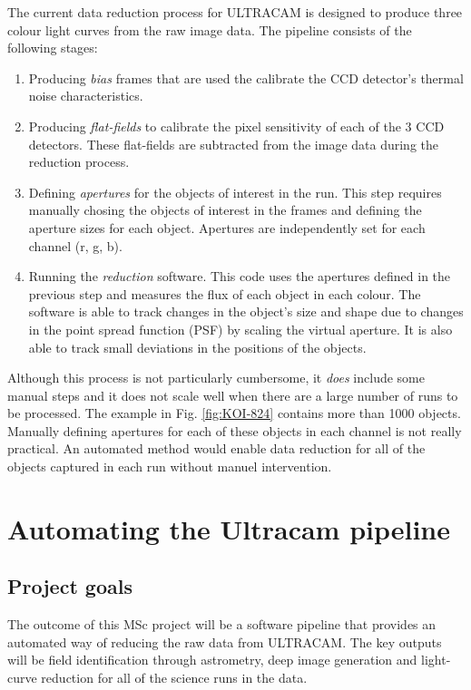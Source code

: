 \documentclass[a4paper,10pt]{article}
\begin{document}
The current data reduction process for ULTRACAM is designed to produce three colour light curves from the raw image data. The pipeline consists of the following stages:
\begin{enumerate}
	\item Producing \emph{bias} frames that are used the calibrate the CCD detector's thermal noise characteristics. 
	\item Producing \emph{flat-fields} to calibrate the pixel sensitivity of each of the 3 CCD detectors. These flat-fields are subtracted from the image data during the reduction process.
	\item Defining \emph{apertures} for the objects of interest in the run. This step requires manually chosing the objects of interest in the frames and defining the aperture sizes for each object. Apertures are independently set for each channel (r, g, b). 
	\item Running the \emph{reduction} software. This code uses the apertures defined in the previous step and measures the flux of each object in each colour. The software is able to track changes in the object's size and shape due to changes in the point spread function (PSF) by scaling the virtual aperture. It is also able to track small deviations in the positions of the objects. 
\end{enumerate} 
Although this process is not particularly cumbersome, it \emph{does} include some manual steps and it does not scale well when there are a large number of runs to be processed. The example in Fig. \ref{fig:KOI-824} contains more than 1000 objects. Manually defining apertures for each of these objects in each channel is not really practical. An automated method would enable data reduction for all of the objects captured in each run without manuel intervention. 

\section{Automating the Ultracam pipeline}

\subsection{Project goals}
The outcome of this MSc project will be a software pipeline that provides an automated way of reducing the raw data from ULTRACAM.  The key outputs will be field identification through astrometry, deep image generation and light-curve reduction for all of the science runs in the data. 
\end{document}
